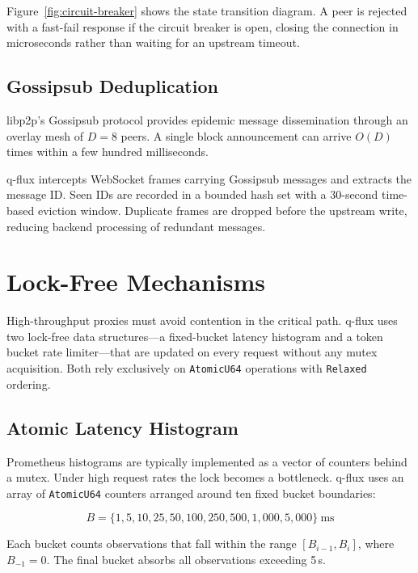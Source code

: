 \documentclass[a4paper, 11pt]{article}
\begin{document}
Figure~\ref{fig:circuit-breaker} shows the state transition diagram.
A peer is rejected with a fast-fail response if the circuit breaker
is open, closing the connection in microseconds rather than waiting
for an upstream timeout.

\subsection{Gossipsub Deduplication}
\label{sec:gossipsub-dedup}

libp2p's Gossipsub protocol provides epidemic message dissemination
through an overlay mesh of $D=8$ peers. A single block announcement
can arrive $O(D)$ times within a few hundred milliseconds.

q-flux intercepts WebSocket frames carrying Gossipsub messages and
extracts the message ID. Seen IDs are recorded in a bounded hash set
with a 30-second time-based eviction window. Duplicate frames are
dropped before the upstream write, reducing backend processing of
redundant messages.


\section{Lock-Free Mechanisms}
\label{sec:lock-free}

High-throughput proxies must avoid contention in the critical path.
q-flux uses two lock-free data structures---a fixed-bucket latency
histogram and a token bucket rate limiter---that are updated on every
request without any mutex acquisition. Both rely exclusively on
\texttt{AtomicU64} operations with \texttt{Relaxed} ordering.

\subsection{Atomic Latency Histogram}
\label{sec:latency-histogram}

Prometheus histograms are typically implemented as a vector of counters
behind a mutex. Under high request rates the lock becomes a bottleneck.
q-flux uses an array of \texttt{AtomicU64} counters arranged around ten
fixed bucket boundaries:

\[
B = \{1, 5, 10, 25, 50, 100, 250, 500, 1{,}000, 5{,}000\}\ \text{ms}
\]

Each bucket counts observations that fall within the range
$[B_{i-1}, B_i]$, where $B_{-1} = 0$. The final bucket absorbs all
observations exceeding 5\,s.
\end{document}
